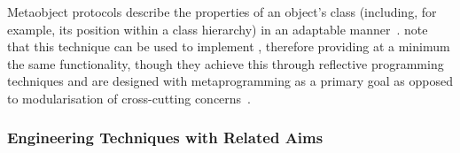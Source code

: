 Metaobject protocols describe the properties of an object's class (including,
for example, its position within a class hierarchy) in an adaptable
manner~\cite{kiczales1991art}. \citet{espakaspect} note that this technique can
be used to implement \aspectorientation{}, therefore providing at a minimum the
same functionality, though they achieve this through reflective programming
techniques and are designed with metaprogramming as a primary goal as opposed to
modularisation of cross-cutting
concerns~\cite{kiczales1991art,sullivan2001aspect}.









\subsubsection{Engineering Techniques with Related Aims}
\label{engineering_techniques_as_aop_alternative}

